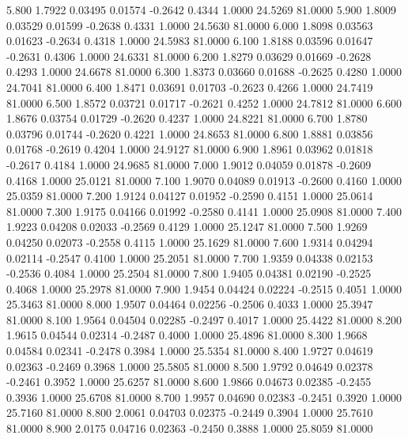    5.800   1.7922   0.03495   0.01574  -0.2642   0.4344   1.0000  24.5269  81.0000
   5.900   1.8009   0.03529   0.01599  -0.2638   0.4331   1.0000  24.5630  81.0000
   6.000   1.8098   0.03563   0.01623  -0.2634   0.4318   1.0000  24.5983  81.0000
   6.100   1.8188   0.03596   0.01647  -0.2631   0.4306   1.0000  24.6331  81.0000
   6.200   1.8279   0.03629   0.01669  -0.2628   0.4293   1.0000  24.6678  81.0000
   6.300   1.8373   0.03660   0.01688  -0.2625   0.4280   1.0000  24.7041  81.0000
   6.400   1.8471   0.03691   0.01703  -0.2623   0.4266   1.0000  24.7419  81.0000
   6.500   1.8572   0.03721   0.01717  -0.2621   0.4252   1.0000  24.7812  81.0000
   6.600   1.8676   0.03754   0.01729  -0.2620   0.4237   1.0000  24.8221  81.0000
   6.700   1.8780   0.03796   0.01744  -0.2620   0.4221   1.0000  24.8653  81.0000
   6.800   1.8881   0.03856   0.01768  -0.2619   0.4204   1.0000  24.9127  81.0000
   6.900   1.8961   0.03962   0.01818  -0.2617   0.4184   1.0000  24.9685  81.0000
   7.000   1.9012   0.04059   0.01878  -0.2609   0.4168   1.0000  25.0121  81.0000
   7.100   1.9070   0.04089   0.01913  -0.2600   0.4160   1.0000  25.0359  81.0000
   7.200   1.9124   0.04127   0.01952  -0.2590   0.4151   1.0000  25.0614  81.0000
   7.300   1.9175   0.04166   0.01992  -0.2580   0.4141   1.0000  25.0908  81.0000
   7.400   1.9223   0.04208   0.02033  -0.2569   0.4129   1.0000  25.1247  81.0000
   7.500   1.9269   0.04250   0.02073  -0.2558   0.4115   1.0000  25.1629  81.0000
   7.600   1.9314   0.04294   0.02114  -0.2547   0.4100   1.0000  25.2051  81.0000
   7.700   1.9359   0.04338   0.02153  -0.2536   0.4084   1.0000  25.2504  81.0000
   7.800   1.9405   0.04381   0.02190  -0.2525   0.4068   1.0000  25.2978  81.0000
   7.900   1.9454   0.04424   0.02224  -0.2515   0.4051   1.0000  25.3463  81.0000
   8.000   1.9507   0.04464   0.02256  -0.2506   0.4033   1.0000  25.3947  81.0000
   8.100   1.9564   0.04504   0.02285  -0.2497   0.4017   1.0000  25.4422  81.0000
   8.200   1.9615   0.04544   0.02314  -0.2487   0.4000   1.0000  25.4896  81.0000
   8.300   1.9668   0.04584   0.02341  -0.2478   0.3984   1.0000  25.5354  81.0000
   8.400   1.9727   0.04619   0.02363  -0.2469   0.3968   1.0000  25.5805  81.0000
   8.500   1.9792   0.04649   0.02378  -0.2461   0.3952   1.0000  25.6257  81.0000
   8.600   1.9866   0.04673   0.02385  -0.2455   0.3936   1.0000  25.6708  81.0000
   8.700   1.9957   0.04690   0.02383  -0.2451   0.3920   1.0000  25.7160  81.0000
   8.800   2.0061   0.04703   0.02375  -0.2449   0.3904   1.0000  25.7610  81.0000
   8.900   2.0175   0.04716   0.02363  -0.2450   0.3888   1.0000  25.8059  81.0000

